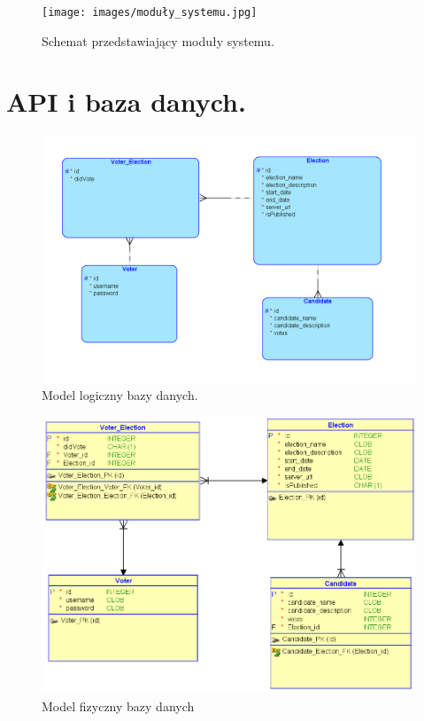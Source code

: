 \documentclass[a4paper,13pt]{report}
\begin{document}
\newpage

\begin{figure}[h]
    \centering
    \texttt{[image: images/moduły\_systemu.jpg]}
    \caption{Schemat przedstawiający moduły systemu.}
\end{figure}

\newpage

\section{API i baza danych.}

\begin{figure}[h]
    \centering
    \includegraphics[scale=0.4]{images/Logical.png}
    \caption{Model logiczny bazy danych.}
\end{figure}

\begin{figure}[h]
    \centering
    \includegraphics[scale=0.4]{images/Relational.png}
    \caption{Model fizyczny bazy danych}
\end{figure}
\end{document}
